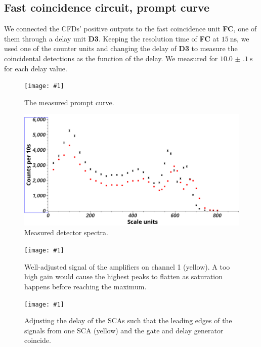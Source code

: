 \documentclass[twocolumn]{article}
\newcommand{\insertFigure}[1]{%
   \texttt{[image: \#1]}%
}
\begin{document}
\subsection{Fast coincidence circuit, prompt curve}
We connected the CFDs' positive outputs to the fast coincidence unit \textbf{FC}, one of them through a delay unit \textbf{D3}. Keeping the resolution time of \textbf{FC} at $\SI{15}{\nano\second}$, we used one of the counter units and changing the delay of \textbf{D3} to measure the coincidental detections as the function of the delay. We measured for $\SI[separate-uncertainty = true]{10.0(1) }{\second}$ for each delay value.
\begin{figure}[!h]
\centering
\insertFigure{prompt_cropped.png}
\caption{The measured prompt curve.}
\end{figure}
\begin{figure}[!h]
\centering
\includegraphics[width=1.1\linewidth]{detectors.png}
\caption{Measured detector spectra.}
\end{figure}
\begin{figure}
\centering
\insertFigure{./screenshots/SC08_cropped.png}
\caption{Well-adjusted signal of the amplifiers on channel 1 (yellow). A too high gain would cause the highest peaks to flatten as saturation happens before reaching the maximum.} 
\label{fig:amp}
\end{figure}
\begin{figure}
\centering
\insertFigure{./screenshots/SC07_cropped.png}
\caption{Adjusting the delay of the SCAs such that the leading edges of the signals from one SCA (yellow) and the gate and delay generator coincide.}
\label{fig:sca-overlap}
\end{figure}
\end{document}
